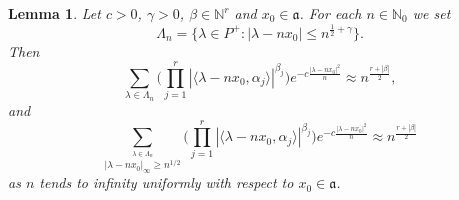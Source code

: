 \documentclass[11pt]{amsart}
\newcommand{\NN}{\mathbb{N}}
\newcommand{\norm}[1]{\lvert {#1} \rvert}
\newcommand{\sprod}[2]{\langle {#1}, {#2} \rangle}
\theoremstyle{plain}
\newtheorem{lemma}[theorem]{Lemma}
\theoremstyle{definition}
\numberwithin{equation}{section}
\begin{document}
\begin{lemma}
	\label{lem:1}
	Let $c > 0$, $\gamma > 0$, $\beta \in \NN^r$ and $x_0 \in \mathfrak{a}$. For each $n \in \NN_0$ we set
	\[
		\Lambda_n = \Big\{\lambda \in P^+ : \norm{\lambda - n x_0} \leqslant n^{\frac{1}{2}+\gamma}\Big\}.
	\]
	Then
	\begin{equation}
		\label{eq:23}
		\sum_{\lambda \in \Lambda_n}
		\Big(\prod_{j = 1}^r |\sprod{\lambda - n x_0}{\alpha_j}|^{\beta_j} \Big)
		e^{-c \frac{\norm{\lambda - n x_0}^2}{n} }
		\approx n^{\frac{r+|\beta|}{2}},
	\end{equation}
	and
	\begin{equation}
		\label{eq:24}
		\sum_{\stackrel{\lambda \in \Lambda_n}{|\lambda - n x_0|_\infty \geqslant n^{1/2}}}
		\Big(\prod_{j = 1}^r |\sprod{\lambda - n x_0}{\alpha_j}|^{\beta_j} \Big)
		e^{-c \frac{\norm{\lambda - n x_0}^2}{n} }
		\approx n^{\frac{r+|\beta|}{2}}
	\end{equation}
	as $n$ tends to infinity uniformly with respect to $x_0 \in \mathfrak{a}$.
\end{lemma}
\end{document}
